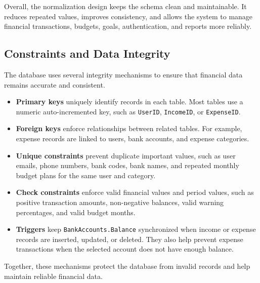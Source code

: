 ﻿\documentclass{article}
\begin{document}
Overall, the normalization design keeps the schema clean and maintainable. It reduces repeated values, improves consistency, and allows the system to manage financial transactions, budgets, goals, authentication, and reports more reliably.

\subsection{Constraints and Data Integrity}

The database uses several integrity mechanisms to ensure that financial data remains accurate and consistent.

\begin{itemize}
    \item \textbf{Primary keys} uniquely identify records in each table. Most tables use a numeric 
    auto-incremented key, such as \texttt{UserID}, \texttt{IncomeID}, or \texttt{ExpenseID}.

    \item \textbf{Foreign keys} enforce relationships between related tables. For example, expense records 
    are linked to users, bank accounts, and expense categories.

    \item \textbf{Unique constraints} prevent duplicate important values, such as user emails, phone numbers, 
    bank codes, bank names, and repeated monthly budget plans for the same user and category.

    \item \textbf{Check constraints} enforce valid financial values and period values, such as positive 
    transaction amounts, non-negative balances, valid warning percentages, and valid budget months.

    \item \textbf{Triggers} keep \texttt{BankAccounts.Balance} synchronized when income or expense records 
    are inserted, updated, or deleted. They also help prevent expense transactions when the selected account 
    does not have enough balance.
\end{itemize}

Together, these mechanisms protect the database from invalid records and help maintain reliable financial data.

\end{document}
